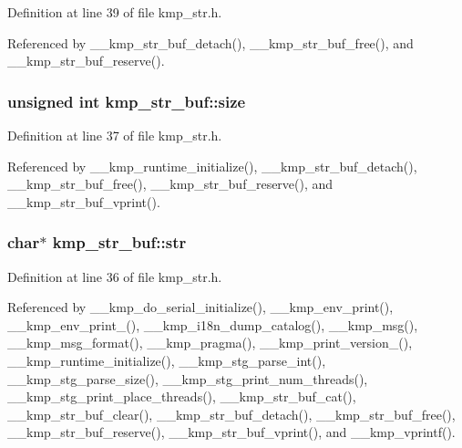 Definition at line 39 of file kmp\-\_\-str.\-h.



Referenced by \-\_\-\-\_\-kmp\-\_\-str\-\_\-buf\-\_\-detach(), \-\_\-\-\_\-kmp\-\_\-str\-\_\-buf\-\_\-free(), and \-\_\-\-\_\-kmp\-\_\-str\-\_\-buf\-\_\-reserve().

\hypertarget{structkmp__str__buf_ac6d2fa14f64844ce2113b7d3d3b8d82a}{
\subsubsection[{size}]{\setlength{\rightskip}{0pt plus 5cm}unsigned {\bf int} kmp\-\_\-str\-\_\-buf\-::size}}\label{structkmp__str__buf_ac6d2fa14f64844ce2113b7d3d3b8d82a}


Definition at line 37 of file kmp\-\_\-str.\-h.



Referenced by \-\_\-\-\_\-kmp\-\_\-runtime\-\_\-initialize(), \-\_\-\-\_\-kmp\-\_\-str\-\_\-buf\-\_\-detach(), \-\_\-\-\_\-kmp\-\_\-str\-\_\-buf\-\_\-free(), \-\_\-\-\_\-kmp\-\_\-str\-\_\-buf\-\_\-reserve(), and \-\_\-\-\_\-kmp\-\_\-str\-\_\-buf\-\_\-vprint().

\hypertarget{structkmp__str__buf_ac87d13b209cb66e1747bf327dddad2bf}{
\subsubsection[{str}]{\setlength{\rightskip}{0pt plus 5cm}char$\ast$ kmp\-\_\-str\-\_\-buf\-::str}}\label{structkmp__str__buf_ac87d13b209cb66e1747bf327dddad2bf}


Definition at line 36 of file kmp\-\_\-str.\-h.



Referenced by \-\_\-\-\_\-kmp\-\_\-do\-\_\-serial\-\_\-initialize(), \-\_\-\-\_\-kmp\-\_\-env\-\_\-print(), \-\_\-\-\_\-kmp\-\_\-env\-\_\-print\-\_(), \-\_\-\-\_\-kmp\-\_\-i18n\-\_\-dump\-\_\-catalog(), \-\_\-\-\_\-kmp\-\_\-msg(), \-\_\-\-\_\-kmp\-\_\-msg\-\_\-format(), \-\_\-\-\_\-kmp\-\_\-pragma(), \-\_\-\-\_\-kmp\-\_\-print\-\_\-version\-\_(), \-\_\-\-\_\-kmp\-\_\-runtime\-\_\-initialize(), \-\_\-\-\_\-kmp\-\_\-stg\-\_\-parse\-\_\-int(), \-\_\-\-\_\-kmp\-\_\-stg\-\_\-parse\-\_\-size(), \-\_\-\-\_\-kmp\-\_\-stg\-\_\-print\-\_\-num\-\_\-threads(), \-\_\-\-\_\-kmp\-\_\-stg\-\_\-print\-\_\-place\-\_\-threads(), \-\_\-\-\_\-kmp\-\_\-str\-\_\-buf\-\_\-cat(), \-\_\-\-\_\-kmp\-\_\-str\-\_\-buf\-\_\-clear(), \-\_\-\-\_\-kmp\-\_\-str\-\_\-buf\-\_\-detach(), \-\_\-\-\_\-kmp\-\_\-str\-\_\-buf\-\_\-free(), \-\_\-\-\_\-kmp\-\_\-str\-\_\-buf\-\_\-reserve(), \-\_\-\-\_\-kmp\-\_\-str\-\_\-buf\-\_\-vprint(), and \-\_\-\-\_\-kmp\-\_\-vprintf().

